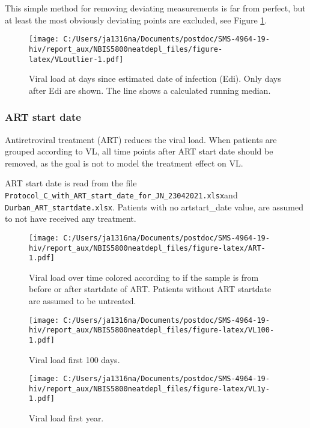 \documentclass[
]{article}
\begin{document}
This simple method for removing deviating measurements is far from perfect, but at least the most obviously deviating points are excluded, see Figure \ref{fig:VLoutlier}.

\begin{figure}
\centering
\texttt{[image: C:/Users/ja1316na/Documents/postdoc/SMS-4964-19-hiv/report\_aux/NBIS5800neatdepl\_files/figure-latex/VLoutlier-1.pdf]}
\caption{\label{fig:VLoutlier}Viral load at days since estimated date of infection (Edi). Only days after Edi are shown. The line shows a calculated running median.}
\end{figure}

\hypertarget{art-start-date}{%
\subsubsection{ART start date}\label{art-start-date}}

Antiretroviral treatment (ART) reduces the viral load. When patients are grouped according to VL, all time points after ART start date should be removed, as the goal is not to model the treatment effect on VL.

ART start date is read from the file \texttt{Protocol\_C\_with\_ART\_start\_date\_for\_JN\_23042021.xlsx}and \texttt{Durban\_ART\_startdate.xlsx}. Patients with no artstart\_date value, are assumed to not have received any treatment.

\begin{figure}
\centering
\texttt{[image: C:/Users/ja1316na/Documents/postdoc/SMS-4964-19-hiv/report\_aux/NBIS5800neatdepl\_files/figure-latex/ART-1.pdf]}
\caption{\label{fig:ART}Viral load over time colored according to if the sample is from before or after startdate of ART. Patients without ART startdate are assumed to be untreated.}
\end{figure}

\begin{figure}
\centering
\texttt{[image: C:/Users/ja1316na/Documents/postdoc/SMS-4964-19-hiv/report\_aux/NBIS5800neatdepl\_files/figure-latex/VL100-1.pdf]}
\caption{\label{fig:VL100}Viral load first 100 days.}
\end{figure}

\begin{figure}
\centering
\texttt{[image: C:/Users/ja1316na/Documents/postdoc/SMS-4964-19-hiv/report\_aux/NBIS5800neatdepl\_files/figure-latex/VL1y-1.pdf]}
\caption{\label{fig:VL1y}Viral load first year.}
\end{figure}
\end{document}
